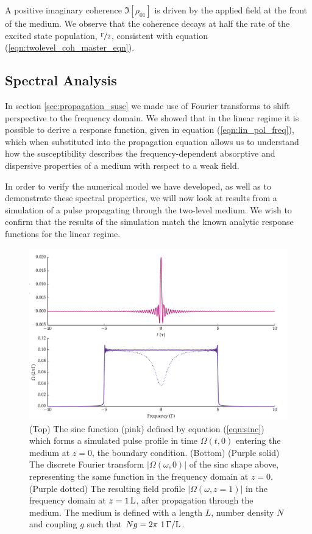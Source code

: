     A positive imaginary coherence $\Im[{\rho_{01}}]$ is driven by the applied
    field at the front of the medium. We observe that the coherence decays at
    half the rate of the excited state population, $\nicefrac{\Gamma}{2}$,
    consistent with equation (\ref{eqn:twolevel_coh_master_eqn}).

  \subsection{Spectral Analysis}

    In section \ref{sec:propagation_susc} we made use of Fourier transforms to
    shift perspective to the frequency domain. We showed that in the linear
    regime it is possible to derive a response function, given in equation
    (\ref{eqn:lin_pol_freq}), which when substituted into the propagation
    equation allows us to understand how the susceptibility describes the
    frequency-dependent absorptive and dispersive properties of a medium with
    respect to a weak field.

    In order to verify the numerical model we have developed, as well as to
    demonstrate these spectral properties, we will now look at results from a
    simulation of a pulse propagating through the two-level medium. We wish to
    confirm that the results of the simulation match the known analytic response
    functions for the linear regime.

    \begin{figure}
    \includegraphics[width=\linewidth]
      {figs/02_propagation/two_mb_solve_f03_fig2.pdf}
    \caption{
    (Top) The sinc function (pink) defined by equation (\ref{eqn:sinc}) which
    forms a simulated pulse profile in time $\Omega(t,0)$ entering the medium at
    $z=0$, \ie the boundary condition. (Bottom) (Purple solid) The discrete
    Fourier transform $\lvert \Omega(\omega,0) \rvert$ of the sinc shape above,
    representing the same function in the frequency domain at $z=0$. (Purple
    dotted) The resulting field profile $\lvert \Omega(\omega,z=1) \rvert$ in
    the frequency domain at $z = \unit[1]{L}$, after propagation through the
    medium. The medium is defined with a length $L$, number density $N$ and
    coupling $g$ such that $Ng = \unit[2\pi~1]{\Gamma /L}$.
    }
    \label{fig:sinc_time_freq}
    \end{figure}

